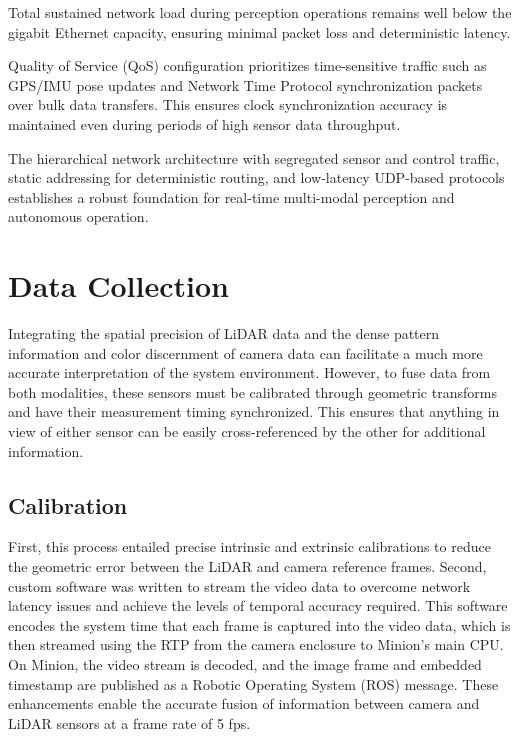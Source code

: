 \documentclass{erauthesis}
\begin{document}
Total sustained network load during perception operations remains well below the gigabit Ethernet capacity, ensuring minimal packet loss and deterministic latency.

Quality of Service (QoS) configuration prioritizes time-sensitive traffic such as \ac{GPS}/\ac{IMU} pose updates and Network Time Protocol synchronization packets over bulk data transfers. This ensures clock synchronization accuracy is maintained even during periods of high sensor data throughput.

The hierarchical network architecture with segregated sensor and control traffic, static addressing for deterministic routing, and low-latency \ac{UDP}-based protocols establishes a robust foundation for real-time multi-modal perception and autonomous operation.

\section{Data Collection}

Integrating the spatial precision of LiDAR data and the dense pattern information and color discernment of camera data can facilitate a much more accurate interpretation of the system environment. However, to fuse data from both modalities, these sensors must be calibrated through geometric transforms and have their measurement timing synchronized. This ensures that anything in view of either sensor can be easily cross-referenced by the other for additional information.
    
\subsection{Calibration}

First, this process entailed precise intrinsic and extrinsic calibrations to reduce the geometric error between the LiDAR and camera reference frames. 
Second, custom software was written to stream the video data to overcome network latency issues and achieve the levels of temporal accuracy required. 
This software encodes the system time that each frame is captured into the video data, which is then streamed using the \ac{RTP} from the camera enclosure to Minion's main CPU. 
On Minion, the video stream is decoded, and the image frame and embedded timestamp are published as a Robotic Operating System (ROS) message. 
These enhancements enable the accurate fusion of information between camera and LiDAR sensors at a frame rate of 5 fps.
\end{document}
